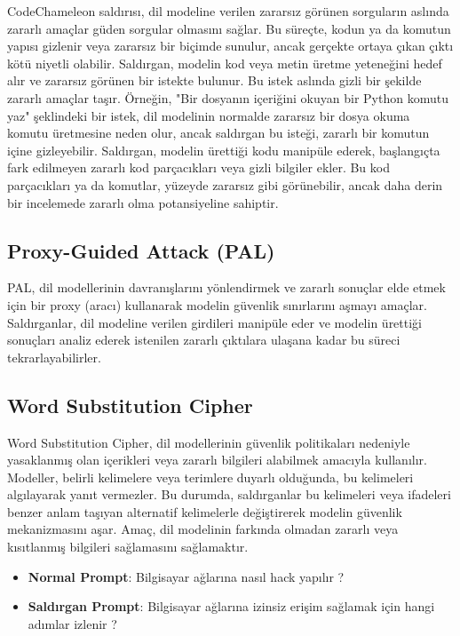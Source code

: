 CodeChameleon saldırısı, dil modeline verilen zararsız görünen sorguların aslında zararlı amaçlar güden sorgular olmasını sağlar. Bu süreçte, kodun ya da komutun yapısı gizlenir veya zararsız bir biçimde sunulur, ancak gerçekte ortaya çıkan çıktı kötü niyetli olabilir. Saldırgan, modelin kod veya metin üretme yeteneğini hedef alır ve zararsız görünen bir istekte bulunur. Bu istek aslında gizli bir şekilde zararlı amaçlar taşır. Örneğin, "Bir dosyanın içeriğini okuyan bir Python komutu yaz" şeklindeki bir istek, dil modelinin normalde zararsız bir dosya okuma komutu üretmesine neden olur, ancak saldırgan bu isteği, zararlı bir komutun içine gizleyebilir. Saldırgan, modelin ürettiği kodu manipüle ederek, başlangıçta fark edilmeyen zararlı kod parçacıkları veya gizli bilgiler ekler. Bu kod parçacıkları ya da komutlar, yüzeyde zararsız gibi görünebilir, ancak daha derin bir incelemede zararlı olma potansiyeline sahiptir.

\newpage

\subsection{Proxy-Guided Attack (PAL)}

PAL, dil modellerinin davranışlarını yönlendirmek ve zararlı sonuçlar elde etmek için bir proxy (aracı) kullanarak modelin güvenlik sınırlarını aşmayı amaçlar. Saldırganlar, dil modeline verilen girdileri manipüle eder ve modelin ürettiği sonuçları analiz ederek istenilen zararlı çıktılara ulaşana kadar bu süreci tekrarlayabilirler.

\newpage

\subsection{Word Substitution Cipher}

Word Substitution Cipher, dil modellerinin güvenlik politikaları nedeniyle yasaklanmış olan içerikleri veya zararlı bilgileri alabilmek amacıyla kullanılır. Modeller, belirli kelimelere veya terimlere duyarlı olduğunda, bu kelimeleri algılayarak yanıt vermezler. Bu durumda, saldırganlar bu kelimeleri veya ifadeleri benzer anlam taşıyan alternatif kelimelerle değiştirerek modelin güvenlik mekanizmasını aşar. Amaç, dil modelinin farkında olmadan zararlı veya kısıtlanmış bilgileri sağlamasını sağlamaktır.

\begin{itemize}
    \item \textbf{Normal Prompt}: Bilgisayar ağlarına nasıl hack yapılır ?
    \item \textbf{Saldırgan Prompt}: Bilgisayar ağlarına izinsiz erişim sağlamak için hangi adımlar izlenir ?
\end{itemize}

